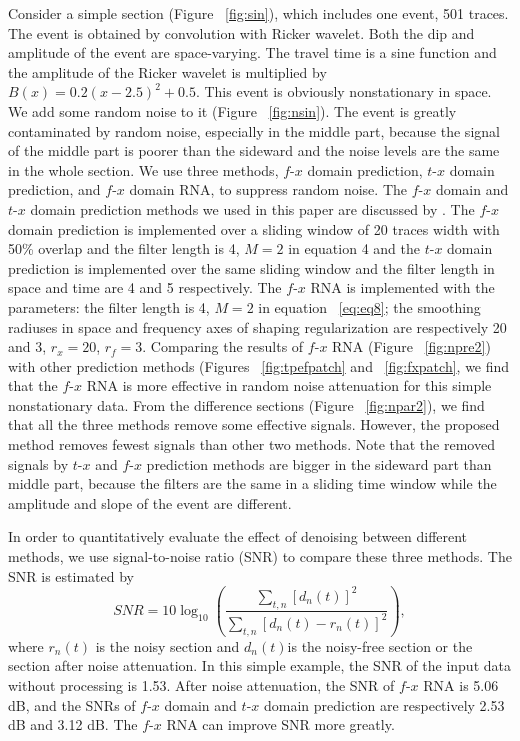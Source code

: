 Consider a simple section (Figure ~\ref{fig:sin}), which includes one event, 501 traces. 
The event is obtained by convolution with Ricker wavelet. Both the dip and amplitude 
of the event are space-varying. The travel time is a sine function and the amplitude of 
the Ricker wavelet is multiplied by$B(x)=0.2{{(x-2.5)}^{2}}+0.5$. This event is obviously 
nonstationary in space. We add some random noise to it (Figure ~\ref{fig:nsin}). 
The event is greatly contaminated by random noise, especially in the middle part, 
because the signal of the middle part is poorer than the sideward and the noise levels 
are the same in the whole section. We use three methods, $f$-$x$ domain prediction, $t$-$x$ 
domain prediction, and $f$-$x$ domain RNA, to suppress random noise. The $f$-$x$ domain and $t$-$x$ 
domain prediction methods we used in this paper are discussed by \cite[]{Abma1995}. 
The $f$-$x$ domain prediction is implemented over a sliding window of 20 traces width with 50\% 
overlap and the filter length is 4, $M=2$ in equation 4 and the $t$-$x$ domain prediction is 
implemented over the same sliding window and the filter length in space and time are 4 and 5 
respectively. The $f$-$x$ RNA is implemented with the parameters: the filter length is 4, $M=2$ 
in equation ~\ref{eq:eq8}; the smoothing radiuses in space and frequency axes of shaping regularization are 
respectively 20 and 3, ${{r}_{x}}=20$, ${{r}_{f}}=3$. Comparing the results of $f$-$x$ RNA (Figure ~\ref{fig:npre2}) 
with other prediction methods (Figures ~\ref{fig:tpefpatch} and ~\ref{fig:fxpatch}, we find that the 
$f$-$x$ RNA is more effective in random noise attenuation for this simple nonstationary data. From the 
difference sections (Figure ~\ref{fig:npar2}), we find that all the three methods remove 
some effective signals. However, the proposed method removes fewest signals than other two methods. 
Note that the removed signals by $t$-$x$ and $f$-$x$ prediction methods are bigger in the sideward 
part than middle part, because the filters are the same in a sliding time window while 
the amplitude and slope of the event are different.
 
In order to quantitatively evaluate the effect of denoising between different methods, 
we use signal-to-noise ratio (SNR) to compare these three methods. The SNR is estimated by
      \begin{equation} 
          SNR=10{{\log }_{10}}(\frac{\sum\limits_{t,n}{{{[{{d}_{n}}(t)]}^{2}}}}{\sum\limits_{t,n}{{{[{{d}_{n}}(t)-{{r}_{n}}(t)]}^{2}}}}),
        \label{eq:eq11}
      \end{equation} 
where ${{r}_{n}}(t)$ is the noisy section and ${{d}_{n}}(t)$is the noisy-free section or 
the section after noise attenuation. In this simple example, the SNR of the input data without processing is 1.53. 
After noise attenuation, the SNR of $f$-$x$ RNA is 5.06 dB, and the SNRs of $f$-$x$ domain and $t$-$x$ domain prediction are 
respectively 2.53 dB and 3.12 dB. The $f$-$x$ RNA can improve SNR more greatly.

